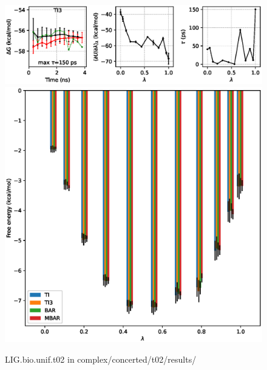 \documentclass[journal=jctcce,manuscript=article,hyperref=false]{achemso}
\begin{document}
\clearpage
\pagebreak
\begin{figure}
\includegraphics[clip,width=6in]{complex.concerted.t02.results..GvsT.eps}\vspace{-0.3cm}
\includegraphics[clip,width=6in]{complex.concerted.t02.results..GvsL.eps}\vspace{-0.3cm}
\caption{LIG.bio.unif.t02 in complex/concerted/t02/results/}
\end{figure}
\end{document}
